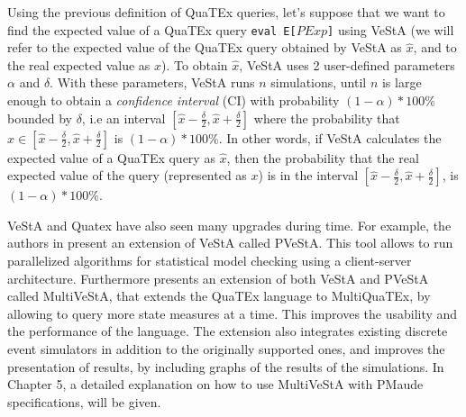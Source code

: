 Using the previous definition of QuaTEx queries, let's suppose that we want to find the expected value of a QuaTEx query \texttt{eval E[$PExp$]} using VeStA (we will refer to the expected value of the QuaTEx query obtained by VeStA as $\hat{x}$, and to the real expected value as $x$). To obtain $\hat{x}$, VeStA uses 2 user-defined parameters $\alpha$ and $\delta$. With these parameters, VeStA runs $n$ simulations, until $n$ is large enough to obtain a \textit{confidence interval} (CI) with probability $(1-\alpha) * 100\%$ bounded by $\delta$, i.e an interval $[\hat{x} - \frac{\delta}{2},\hat{x} + \frac{\delta}{2}]$ where the probability that $x \in [\hat{x} - \frac{\delta}{2},\hat{x} + \frac{\delta}{2}]$ is $(1-\alpha) * 100\%$. In other words, if VeStA calculates the expected value of a QuaTEx query as $\hat{x}$, then the probability that the real expected value of the query (represented as $x$) is in the interval $[\hat{x} - \frac{\delta}{2},\hat{x} + \frac{\delta}{2}]$, is $(1-\alpha) * 100\%$.

VeStA and Quatex have also seen many upgrades during time. For example, the authors in \cite{AlTurki2011} present an extension of VeStA called PVeStA. This tool allows to run parallelized algorithms for statistical model checking using a client-server architecture. Furthermore \cite{multivesta} presents an extension of both VeStA and PVeStA called MultiVeStA, that extends the QuaTEx language to MultiQuaTEx, by allowing to query more state measures at a time. This improves the usability and the performance of the language. The extension also integrates existing discrete event simulators in addition to the originally supported ones, and improves the presentation of results, by including graphs of the results of the simulations. In Chapter 5, a detailed explanation on how to use MultiVeStA with PMaude specifications, will be given.
 


